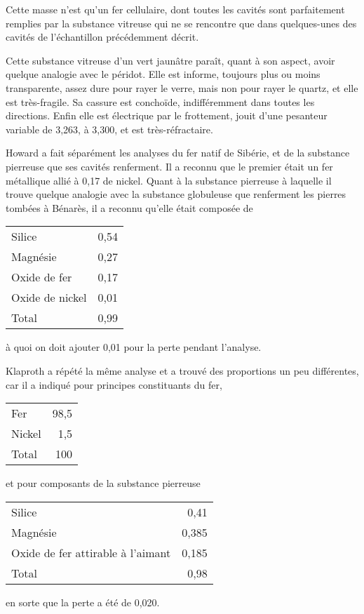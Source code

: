 \documentclass[a4paper, 12pt, oneside, french]{article}
\begin{document}
Cette masse n'est qu'un fer cellulaire, dont toutes les cavités sont parfaitement remplies par la substance vitreuse qui ne se rencontre que dans quelques-unes des cavités de l'échantillon précédemment décrit.

Cette substance vitreuse d'un vert jaunâtre paraît, quant à son aspect, avoir quelque analogie avec le péridot. Elle est informe, toujours plus ou moins transparente, assez dure pour rayer le verre, mais non pour rayer le quartz, et elle est très-fragile. Sa cassure est conchoïde, indifféremment dans toutes les directions. Enfin elle est électrique par le frottement, jouit d'une pesanteur variable de 3,263, à 3,300, et est très-réfractaire.

Howard a fait séparément les analyses du fer natif de Sibérie, et de la substance pierreuse que ses cavités renferment. Il a reconnu que le premier était un fer métallique allié à 0,17 de nickel. Quant à la substance pierreuse à laquelle il trouve quelque analogie avec la substance globuleuse que renferment les pierres tombées à Bénarès, il a reconnu qu'elle était composée de
\begin{table}[H]
    \centering
    \begin{tabular}{l r}
        Silice & 0,54 \\
        Magnésie & 0,27 \\
        Oxide de fer & 0,17 \\
        Oxide de nickel & 0,01 \\ \hline
        Total & 0,99 \\
    \end{tabular}
\end{table}
à quoi on doit ajouter 0,01 pour la perte pendant l'analyse.

Klaproth a répété la même analyse et a trouvé des proportions un peu différentes, car il a indiqué pour principes constituants du fer,
\begin{table}[H]
    \centering
    \begin{tabular}{l r}
        Fer & 98,5 \\
        Nickel & 1,5 \\ \hline
        Total & 100 \\
    \end{tabular}
\end{table}
et pour composants de la substance pierreuse
\begin{table}[H]
    \centering
    \begin{tabular}{l r}
        Silice & 0,41 \\
        Magnésie & 0,385 \\
        Oxide de fer attirable à l'aimant & 0,185 \\ \hline
        Total & 0,98 \\
    \end{tabular}
\end{table}
en sorte que la perte a été de 0,020.
\end{document}
